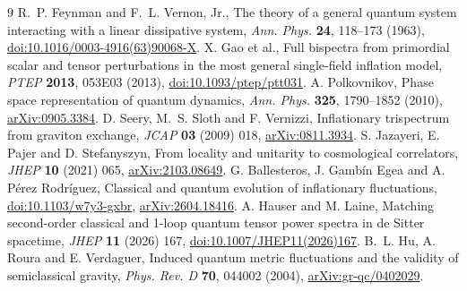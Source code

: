 \documentclass[11pt]{article}
\begin{document}
\begin{thebibliography}{9}
R.~P. Feynman and F.~L. Vernon, Jr.,
The theory of a general quantum system interacting with a linear dissipative system,
\emph{Ann. Phys.} \textbf{24}, 118--173 (1963),
\href{https://doi.org/10.1016/0003-4916(63)90068-X}{doi:10.1016/0003-4916(63)90068-X}.
X. Gao et al.,
Full bispectra from primordial scalar and tensor perturbations in the most general single-field inflation model,
\emph{PTEP} \textbf{2013}, 053E03 (2013),
\href{https://doi.org/10.1093/ptep/ptt031}{doi:10.1093/ptep/ptt031}.
A. Polkovnikov, Phase space representation of quantum dynamics,
\emph{Ann. Phys.} \textbf{325}, 1790--1852 (2010),
\href{https://arxiv.org/abs/0905.3384}{arXiv:0905.3384}.
D. Seery, M.~S. Sloth and F. Vernizzi, Inflationary trispectrum from graviton exchange,
\emph{JCAP} \textbf{03} (2009) 018,
\href{https://arxiv.org/abs/0811.3934}{arXiv:0811.3934}.
S. Jazayeri, E. Pajer and D. Stefanyszyn, From locality and unitarity to cosmological correlators,
\emph{JHEP} \textbf{10} (2021) 065,
\href{https://arxiv.org/abs/2103.08649}{arXiv:2103.08649}.
G. Ballesteros, J. Gamb\'in Egea and A. P\'erez Rodr\'iguez,
Classical and quantum evolution of inflationary fluctuations,
\href{https://doi.org/10.1103/w7y3-gxbr}{doi:10.1103/w7y3-gxbr},
\href{https://arxiv.org/abs/2604.18416}{arXiv:2604.18416}.
A. Hauser and M. Laine,
Matching second-order classical and 1-loop quantum tensor power spectra in de Sitter spacetime,
\emph{JHEP} \textbf{11} (2026) 167,
\href{https://doi.org/10.1007/JHEP11(2026)167}{doi:10.1007/JHEP11(2026)167}.
B.~L. Hu, A. Roura and E. Verdaguer,
Induced quantum metric fluctuations and the validity of semiclassical gravity,
\emph{Phys. Rev. D} \textbf{70}, 044002 (2004),
\href{https://arxiv.org/abs/gr-qc/0402029}{arXiv:gr-qc/0402029}.
\end{thebibliography}
\end{document}
